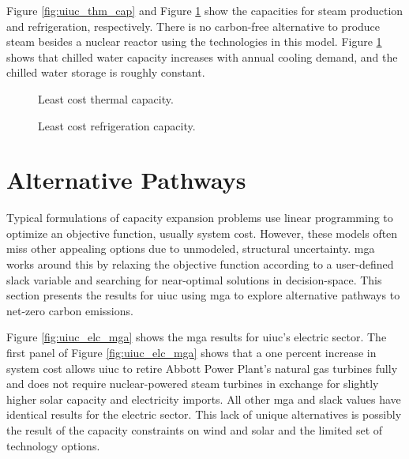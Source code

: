 Figure \ref{fig:uiuc_thm_cap} and Figure \ref{fig:uiuc_chw_cap} show the capacities
for steam production and refrigeration, respectively. There is no carbon-free
alternative to produce steam besides a nuclear reactor using the technologies
in this model. Figure
\ref{fig:uiuc_chw_cap} shows that chilled water capacity increases with annual
cooling demand, and the chilled water storage is roughly constant.

\begin{figure}[H]
  \begin{minipage}{0.48\textwidth}
    \captionsetup{type=figure}
    \centering
    \resizebox{\columnwidth}{!}{}
    \caption[]{Least cost thermal capacity.}
    \label{fig:uiuc_thm_cap}
  \end{minipage}
  \begin{minipage}{0.48\textwidth}
    \centering
    \resizebox{\columnwidth}{!}{}
    \caption[]{Least cost refrigeration capacity.}
    \label{fig:uiuc_chw_cap}
  \end{minipage}
\end{figure}

\section{Alternative Pathways}

Typical formulations of capacity expansion problems use linear programming to optimize
an objective function, usually system cost. However, these models often miss
other appealing options due to unmodeled, structural uncertainty. \gls{mga}
works around this by relaxing the objective function according to a user-defined
slack variable and searching for near-optimal solutions in decision-space. This
section presents the results for \gls{uiuc} using \gls{mga} to explore alternative
pathways to net-zero carbon emissions.

Figure \ref{fig:uiuc_elc_mga} shows the \gls{mga} results for \gls{uiuc}'s electric
sector. The first panel of Figure \ref{fig:uiuc_elc_mga} shows that a one percent
increase in system cost allows \gls{uiuc} to retire Abbott Power Plant's
natural gas turbines fully and does not require nuclear-powered steam turbines
in exchange for slightly higher solar capacity and electricity imports. All other
\gls{mga} and slack values have identical results for the electric sector.
This lack of unique alternatives is possibly the result of the capacity constraints on
wind and solar and the limited set of technology options.

